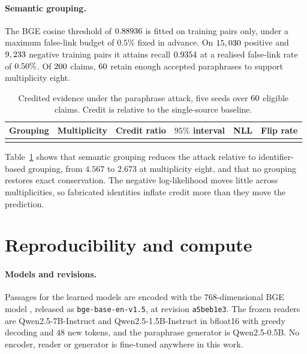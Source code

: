 \documentclass{article}
\begin{document}
\paragraph{Semantic grouping.} The BGE \citep{xiao2023bge} cosine threshold of
$0.88936$ is fitted on training pairs only, under a maximum false-link
budget of $0.5\%$ fixed in advance. On $15,030$ positive and
$9,233$ negative training pairs it attains recall $0.9354$ at a
realised false-link rate of $0.50\%$. Of $200$ claims,
$60$ retain enough accepted paraphrases to support multiplicity eight.

\begin{table}[h]
\centering\small
\caption{Credited evidence under the paraphrase attack, five seeds over
$60$ eligible claims. Credit is relative to the single-source
baseline.}
\label{tab:sybil}
\begin{tabular}{lccccc}
\toprule
Grouping & Multiplicity & Credit ratio & $95\%$ interval & NLL & Flip rate \\
\midrule
\\
\bottomrule
\end{tabular}
\end{table}

Table~\ref{tab:sybil} shows that semantic grouping reduces the attack
relative to identifier-based grouping, from $4.567$ to $2.673$ at
multiplicity eight, and that no grouping restores exact conservation. The
negative log-likelihood moves little across multiplicities, so fabricated
identities inflate credit more than they move the prediction.

\section{Reproducibility and compute}
\label{app:repro}

\paragraph{Models and revisions.} Passages for the learned models are encoded
with the $768$-dimensional BGE model \citep{xiao2023bge}, released as
\texttt{bge-base-en-v1.5}, at revision \texttt{a5beb1e3}. The frozen readers are
Qwen2.5-7B-Instruct and Qwen2.5-1.5B-Instruct \citep{qwen2025qwen25} in
bfloat16 with greedy decoding and $48$ new tokens, and the paraphrase generator
is Qwen2.5-0.5B. No encoder, reader or generator is fine-tuned anywhere in this
work.
\end{document}
